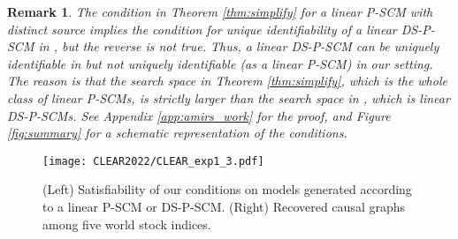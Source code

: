 \documentclass[12pt]{article}
\newtheorem{remark}{Remark}
\begin{document}
\vspace{-2mm}
\begin{remark} \label{remark:relation_to_amirs_work}
The condition in Theorem \ref{thm:simplify} for a linear P-SCM with distinct source implies the condition for unique identifiability of a linear DS-P-SCM in \citep[Theorem 16]{salehkaleybar2020learning}, but the reverse is not true. Thus, a linear DS-P-SCM can be uniquely identifiable in \citep{salehkaleybar2020learning} but not uniquely identifiable (as a linear P-SCM) in our setting. The reason is that 
the search space in Theorem \ref{thm:simplify}, which is the whole class of linear P-SCMs, is strictly larger than the search space in \citep{salehkaleybar2020learning}, which is linear DS-P-SCMs. 
See Appendix \ref{app:amirs_work} for the proof, and Figure \ref{fig:summary} for a schematic representation of the conditions. 
\vspace{-1mm}
\end{remark}

\begin{figure*}[t]
\centering
\begin{minipage}[c]{0.66\textwidth}
\texttt{[image: CLEAR2022/CLEAR\_exp1\_3.pdf]}
\end{minipage}\hfill
\begin{minipage}[c]{0.32\textwidth}
\end{minipage}
\caption{(Left) Satisfiability of our conditions on models generated according to a linear P-SCM or DS-P-SCM.  (Right) Recovered causal graphs among five world stock indices.}
\label{fig:nips2021_exp1}
\end{figure*}
\end{document}
